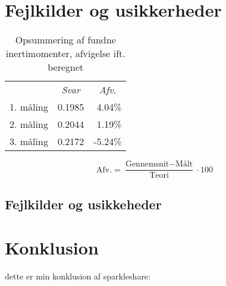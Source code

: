 \section{Fejlkilder og usikkerheder}


\begin{table}[h]
  \begin{tabular}{llr}
    &
    \multicolumn{1}{c}{\emph{Svar}} &
    \multicolumn{1}{c}{\emph{Afv.}}\\
    \cmidrule{2-3}
    1. måling & 0.1985 &  4.04\%   \\
    2. måling & 0.2044 &  1.19\%   \\
    3. måling & 0.2172 & -5.24\%   \\
  \end{tabular}
  \caption[Fundne inertimomenter]{Opsummering af fundne inertimomenter, afvigelse ift. beregnet}
\end{table}

$$\text{Afv.} =\frac{\text{Gennemsnit}-\text{Målt}}{\text{Teori}} \cdot 100$$
\subsection{Fejlkilder og usikkeheder}

\section{Konklusion}
dette er min konklusion af sparkleshare:
